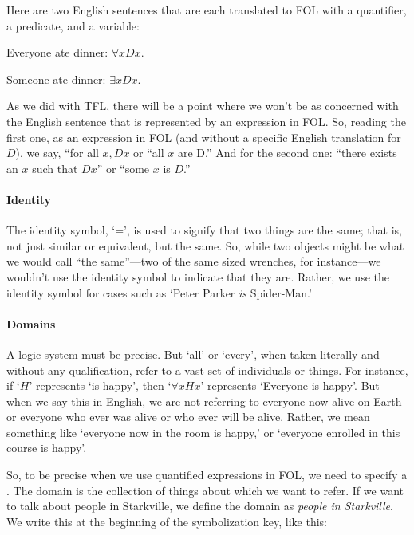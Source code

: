 Here are two English sentences that are each translated to FOL with a quantifier, a predicate, and a variable:

\begin{ebullet}
	\item[] Everyone ate dinner: $\forall x Dx$. 
	\item[] Someone ate dinner: $\exists x Dx$.
\end{ebullet}

As we did with TFL, there will be a point where we won’t be as concerned with the English sentence that is represented by an expression in FOL. So, reading the first one, as an expression in FOL (and without a specific English translation for $D$), we say, ``for all $x, Dx$ or ``all $x$ are D.'' And for the second one: ``there exists an $x$ such that $Dx$” or ``some $x$ is $D$.'' 


\paragraph{Identity}

The identity symbol, `=’, is used to signify that two things are the same; that is, not just similar or equivalent, but the same. So, while two objects might be what we would call ``the same''---two of the same sized wrenches, for instance---we wouldn't use the identity symbol to indicate that they are. Rather, we use the identity symbol for cases such as `Peter Parker \textit{is} Spider-Man.’ 


\paragraph{Domains}

A logic system must be precise. But `all’ or `every’, when taken literally and without any qualification, refer to a vast set of individuals or things. For instance, if `$H$' represents `is happy’, then ‘$\forall x Hx$’ represents ‘Everyone is happy’. But when we say this in English, we are not referring to everyone now alive on Earth or everyone who ever was alive or who ever will be alive. Rather, we mean something like `everyone now in the room is happy,’ or `everyone enrolled in this course is happy’.
 
So, to be precise when we use quantified expressions in FOL, we need to specify a . The domain is the collection of things about which we want to refer. If we want to talk about people in Starkville, we define the domain as \textit{people in Starkville}. We write this at the beginning of the symbolization key, like this:

